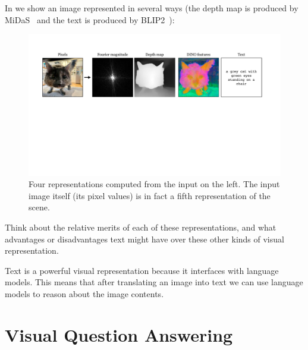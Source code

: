 In \fig{\ref{fig:vision_and_language:different_visual_representations}} we show an image represented in several ways (the depth map is produced by MiDaS~\cite{Ranftl2022} and the text is produced by BLIP2~\cite{li2023blip2}):
\begin{figure}[h!]
    \centerline{
        \includegraphics[width=1.0\linewidth]{figures/vision_and_language/different_visual_representations.pdf}
    }
    \caption{Four representations computed from the input on the left. The input image itself (its pixel values) is in fact a fifth representation of the scene.}
    \label{fig:vision_and_language:different_visual_representations}
\end{figure}


Think about the relative merits of each of these representations, and what advantages or disadvantages text might have over these other kinds of visual representation.

Text is a powerful visual representation because it interfaces with language models. This means that after translating an image into text we can use language models to reason about the image contents.


\section{Visual Question Answering}

